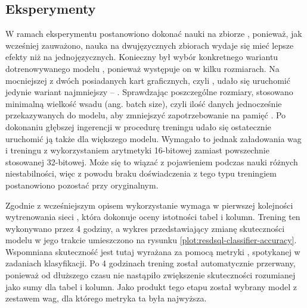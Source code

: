 \subsection{Eksperymenty}
W ramach eksperymentu postanowiono dokonać nauki  na zbiorze , ponieważ, jak wcześniej zauważono, nauka na dwujęzycznych zbiorach wydaje się mieć lepsze efekty niż na jednojęzycznych. Konieczny był wybór konkretnego wariantu dotrenowywanego modelu , ponieważ występuje on w kilku rozmiarach. Na mocniejszej z dwóch posiadanych kart graficznych, czyli , udało się uruchomić jedynie wariant najmniejszy -- . Sprawdzając poszczególne rozmiary, stosowano minimalną wielkość wsadu (ang. batch size), czyli ilość danych jednocześnie przekazywanych do modelu, aby zmniejszyć zapotrzebowanie na pamięć . Po dokonaniu głębszej ingerencji w procedurę treningu udało się ostatecznie uruchomić ją także dla większego modelu. Wymagało to jednak załadowania wag i treningu z wykorzystaniem arytmetyki 16-bitowej zamiast powszechnie stosowanej 32-bitowej. Może się to wiązać z pojawieniem podczas nauki różnych niestabilności, więc z powodu braku doświadczenia z tego typu treningiem postanowiono pozostać przy oryginalnym.

Zgodnie z wcześniejszym opisem wykorzystanie  wymaga w pierwszej kolejności wytrenowania sieci , która dokonuje oceny istotności tabel i kolumn. Trening ten wykonywano przez 4 godziny, a wykres przedstawiający zmianę skuteczności modelu w jego trakcie umieszczono na rysunku \ref{plot:resdsql-classifier-accuracy}. Wspomniana skuteczność jest tutaj wyrażana za pomocą metryki  , spotykanej w zadaniach klasyfikacji. Po 4 godzinach trening został automatycznie przerwany, ponieważ od dłuższego czasu nie nastąpiło zwiększenie skuteczności rozumianej jako sumy  dla tabel i kolumn. Jako produkt tego etapu został wybrany model z zestawem wag, dla którego metryka ta była najwyższa.

